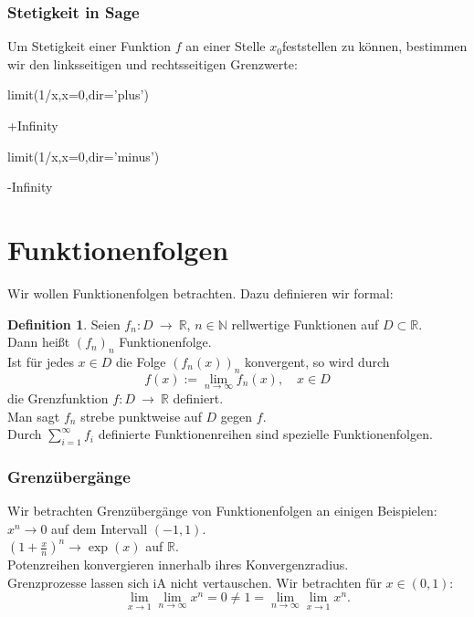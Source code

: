 \documentclass[fontsize=12pt,paper=a4,twoside,bibtotoc,idxtotoc,
liststotoc,pagesize,BCOR1.2cm,DIV15,chapterprefix,pagesize=pdftex]{scrbook}
\theoremstyle{plain}
\theoremstyle{definition}
\newtheorem{df}[equation]{Definition}
\theoremstyle{remark}
\begin{document}
\subsubsection{Stetigkeit in Sage}
Um Stetigkeit einer Funktion $f$ an einer Stelle $x_0$feststellen zu können, bestimmen wir den linksseitigen und rechtsseitigen Grenzwerte:
\begin{sagein}
limit(1/x,x=0,dir='plus') 
\end{sagein}
\begin{sageout}
 +Infinity
\end{sageout}
\begin{sagein}
 limit(1/x,x=0,dir='minus')
\end{sagein}
\begin{sageout}
 -Infinity
\end{sageout}
\section{Funktionenfolgen}
Wir wollen Funktionenfolgen betrachten. Dazu definieren wir formal:
\begin{df}
Seien $f_n: D \ \rightarrow \ \mathbb{R}$, $n \in
\mathbb{N}$  rellwertige Funktionen auf  $D \subset \mathbb{R}$.\\
Dann heißt  $(f_n)_n$ Funktionenfolge.\\
Ist für jedes $x\in D$ die Folge $(f_n(x))_n$ konvergent, so wird durch 
\[ f(x):= \lim_{n \rightarrow \infty} f_n(x), \quad x \in D \]
die Grenzfunktion $f:D \ \rightarrow \ \mathbb{R}$ definiert.\\
Man sagt $f_n$ strebe punktweise auf $D$ gegen $f$.\\  
Durch $\sum_{i=1}^\infty f_i$ definierte Funktionenreihen
sind spezielle Funktionenfolgen.
\end{df}  
\subsubsection{Grenzübergänge}
Wir betrachten Grenzübergänge von Funktionenfolgen an einigen Beispielen:
$x^n \rightarrow 0$ auf dem Intervall $(-1,1)$.\\
$\left( 1+ \frac{x}{n} \right)^n \rightarrow \exp(x)$ auf $\mathbb{R}$.\\
Potenzreihen konvergieren innerhalb ihres Konvergenzradius.\\
Grenzprozesse lassen sich iA nicht vertauschen. Wir betrachten für $x \in (0,1)$:
\[ \lim_{x \rightarrow 1} \lim_{n \rightarrow \infty} x^n =0 \neq 1 = 
  \lim_{n \rightarrow \infty} \lim_{x \rightarrow 1} x^n.\]  
\end{document}
